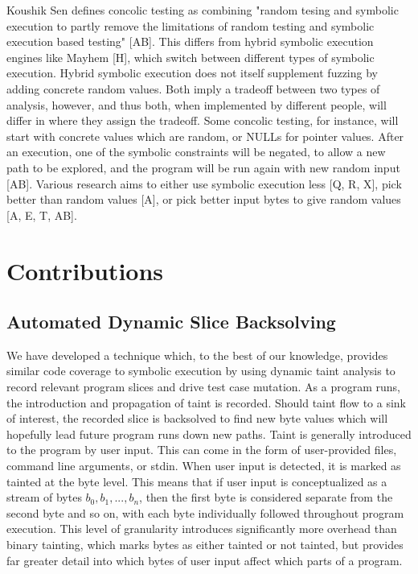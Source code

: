 \documentclass[11pt,expanded,copyright]{fsuthesis}
\begin{document}
Koushik Sen defines concolic testing as combining "random tesing and symbolic execution to partly remove the limitations of random testing and symbolic execution based testing" [AB]. This differs from hybrid symbolic execution engines like Mayhem [H], which switch between different types of symbolic execution. Hybrid symbolic execution does not itself supplement fuzzing by adding concrete random values. Both imply a tradeoff between two types of analysis, however, and thus both, when implemented by different people, will differ in where they assign the tradeoff. Some concolic testing, for instance, will start with concrete values which are random, or NULLs for pointer values. After an execution, one of the symbolic constraints will be negated, to allow a new path to be explored, and the program will be run again with new random input [AB]. Various research aims to either use symbolic execution less [Q, R, X], pick better than random values [A], or pick better input bytes to give random values [A, E, T, AB].

\chapter{Contributions}


\section{Automated Dynamic Slice Backsolving}

We have developed a technique which, to the best of our knowledge, provides similar code coverage to symbolic execution by using dynamic taint analysis to record relevant program slices and drive test case mutation. As a program runs, the introduction and propagation of taint is recorded. Should taint flow to a sink of interest, the recorded slice is backsolved to find new byte values which will hopefully lead future program runs down new paths. Taint is generally introduced to the program by user input. This can come in the form of user-provided files, command line arguments, or stdin. When user input is detected, it is marked as tainted at the byte level. This means that if user input is conceptualized as a stream of bytes $b_0,b_1,...,b_n$, then the first byte is considered separate from the second byte and so on, with each byte individually followed throughout program execution. This level of granularity introduces significantly more overhead than binary tainting, which marks bytes as either tainted or not tainted, but provides far greater detail into which bytes of user input affect which parts of a program.
\end{document}
